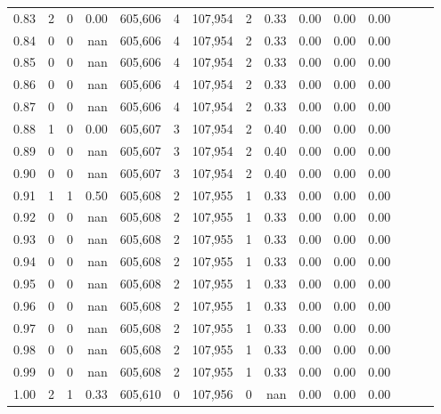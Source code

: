 \begin{tabular}{rrrrrrrrrrrrrrr}
0.83 &       2 &      0 &  0.00 &  605,606 &        4 &  107,954 &        2 &  0.33 &  0.00 &  0.00 &      0.00 \\
0.84 &       0 &      0 &   nan &  605,606 &        4 &  107,954 &        2 &  0.33 &  0.00 &  0.00 &      0.00 \\
0.85 &       0 &      0 &   nan &  605,606 &        4 &  107,954 &        2 &  0.33 &  0.00 &  0.00 &      0.00 \\
0.86 &       0 &      0 &   nan &  605,606 &        4 &  107,954 &        2 &  0.33 &  0.00 &  0.00 &      0.00 \\
0.87 &       0 &      0 &   nan &  605,606 &        4 &  107,954 &        2 &  0.33 &  0.00 &  0.00 &      0.00 \\
0.88 &       1 &      0 &  0.00 &  605,607 &        3 &  107,954 &        2 &  0.40 &  0.00 &  0.00 &      0.00 \\
0.89 &       0 &      0 &   nan &  605,607 &        3 &  107,954 &        2 &  0.40 &  0.00 &  0.00 &      0.00 \\
0.90 &       0 &      0 &   nan &  605,607 &        3 &  107,954 &        2 &  0.40 &  0.00 &  0.00 &      0.00 \\
0.91 &       1 &      1 &  0.50 &  605,608 &        2 &  107,955 &        1 &  0.33 &  0.00 &  0.00 &      0.00 \\
0.92 &       0 &      0 &   nan &  605,608 &        2 &  107,955 &        1 &  0.33 &  0.00 &  0.00 &      0.00 \\
0.93 &       0 &      0 &   nan &  605,608 &        2 &  107,955 &        1 &  0.33 &  0.00 &  0.00 &      0.00 \\
0.94 &       0 &      0 &   nan &  605,608 &        2 &  107,955 &        1 &  0.33 &  0.00 &  0.00 &      0.00 \\
0.95 &       0 &      0 &   nan &  605,608 &        2 &  107,955 &        1 &  0.33 &  0.00 &  0.00 &      0.00 \\
0.96 &       0 &      0 &   nan &  605,608 &        2 &  107,955 &        1 &  0.33 &  0.00 &  0.00 &      0.00 \\
0.97 &       0 &      0 &   nan &  605,608 &        2 &  107,955 &        1 &  0.33 &  0.00 &  0.00 &      0.00 \\
0.98 &       0 &      0 &   nan &  605,608 &        2 &  107,955 &        1 &  0.33 &  0.00 &  0.00 &      0.00 \\
0.99 &       0 &      0 &   nan &  605,608 &        2 &  107,955 &        1 &  0.33 &  0.00 &  0.00 &      0.00 \\
1.00 &       2 &      1 &  0.33 &  605,610 &        0 &  107,956 &        0 &   nan &  0.00 &  0.00 &      0.00 \\
\bottomrule
\end{tabular}
